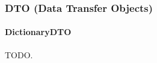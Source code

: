\subsubsection{DTO (Data Transfer Objects)}

\paragraph{DictionaryDTO} \label{DictionaryDTO}
\par TODO.